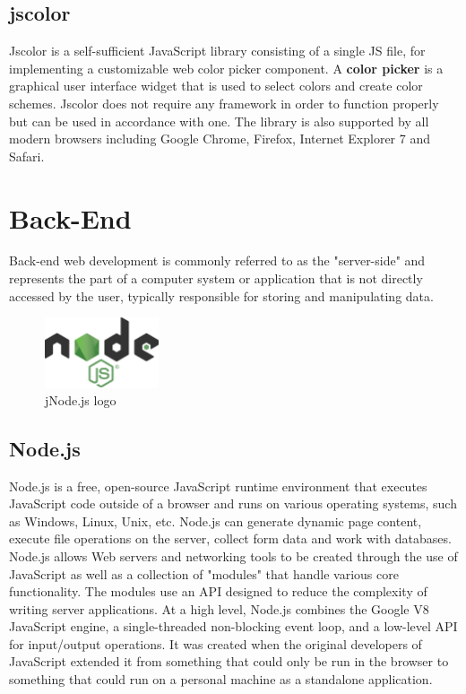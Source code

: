 \documentclass{report}
\begin{document}
\subsection {jscolor}
Jscolor is a self-sufficient JavaScript library consisting of a single JS file, for implementing a customizable web color picker component. A \textbf{color picker} is a graphical user interface widget that is used to select colors and create color schemes. Jscolor does not require any framework in order to function properly but can be used in accordance with one. The library is also supported by all modern browsers including Google Chrome, Firefox, Internet Explorer 7 and Safari.


\section {Back-End}
Back-end web development is commonly referred to as the "server-side" and represents the part of a computer system or application that is not directly accessed by the user, typically responsible for storing and manipulating data.

\begin{figure}
	\vspace*{-1cm}
    \centering
    \includegraphics[width=0.3\textwidth]{nodejs}
	\caption{jNode.js logo}
	\vspace{-10pt} 
\end{figure}
\subsection {Node.js}
Node.js is a free, open-source JavaScript runtime environment that executes JavaScript code outside of a browser and runs on various operating systems, such as Windows, Linux, Unix, etc. Node.js can generate dynamic page content, execute file operations on the server, collect form data and work with databases. Node.js allows Web servers and networking tools to be created through the use of JavaScript as well as a collection of "modules" that handle various core functionality. The modules use an API designed to reduce the complexity of writing server applications. At a high level, Node.js combines the Google V8 JavaScript engine, a single-threaded non-blocking event loop, and a low-level API for input/output operations. It was created when the original developers of JavaScript extended it from something that could only be run in the browser to something that could run on a personal machine as a standalone application.\par
\end{document}
